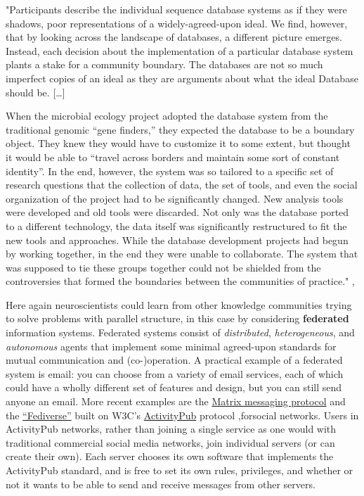 \documentclass[nohyper]{tufte-book-jls}
\begin{document}
\begin{leftbar}
"Participants describe the individual sequence database systems as if
they were shadows, poor representations of a widely-agreed-upon ideal.
We find, however, that by looking across the landscape of databases, a
different picture emerges. Instead, each decision about the
implementation of a particular database system plants a stake for a
community boundary. The databases are not so much imperfect copies of an
ideal as they are arguments about what the ideal Database should be.
{[}\ldots{]}

When the microbial ecology project adopted the database system from the
traditional genomic ``gene finders,'' they expected the database to be a
boundary object. They knew they would have to customize it to some
extent, but thought it would be able to ``travel across borders and
maintain some sort of constant identity''. In the end, however, the
system was so tailored to a specific set of research questions that the
collection of data, the set of tools, and even the social organization
of the project had to be significantly changed. New analysis tools were
developed and old tools were discarded. Not only was the database ported
to a different technology, the data itself was significantly
restructured to fit the new tools and approaches. While the database
development projects had begun by working together, in the end they were
unable to collaborate. The system that was supposed to tie these groups
together could not be shielded from the controversies that formed the
boundaries between the communities of practice." \cite{bietzCollaborationMetagenomicsSequence2009},\end{leftbar}
Here again neuroscientists could learn from other knowledge communities
trying to solve problems with parallel structure, in this case by
considering \textbf{federated} information systems. Federated systems
consist of \emph{distributed}, \emph{heterogeneous}, and
\emph{autonomous} agents that implement some minimal agreed-upon
standards for mutual communication and (co-)operation. A practical
example of a federated system is email: you can choose from a variety of
email services, each of which could have a wholly different set of
features and design, but you can still send anyone an email. More recent examples are the
\href{https://matrix.org/}{Matrix messaging protocol} and the
\href{https://en.wikipedia.org/wiki/Fediverse}{``Fediverse''} built on
W3C's
\href{https://www.w3.org/TR/2018/REC-activitypub-20180123/}{ActivityPub}
protocol \cite{Webber:18:A},forsocial networks. Users in
ActivityPub networks, rather than joining a single service as one would
with traditional commercial social media networks, join individual
servers (or can create their own). Each server chooses its own software
that implements the ActivityPub standard, and is free to set its own
rules, privileges, and whether or not it wants to be able to send and
receive messages from other servers.
\end{document}
